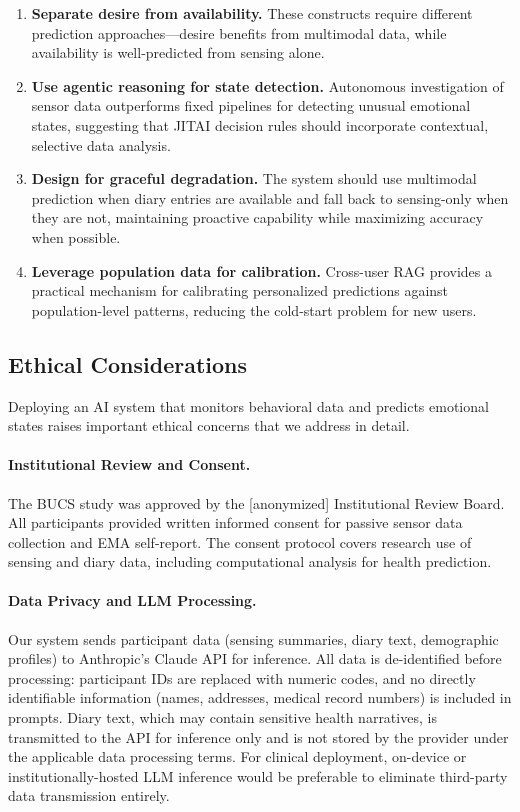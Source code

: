 \documentclass[screen,review,anonymous]{acmart}
\begin{document}
\begin{enumerate}[nosep]
    \item \textbf{Separate desire from availability.} These constructs require different prediction approaches---desire benefits from multimodal data, while availability is well-predicted from sensing alone.

    \item \textbf{Use agentic reasoning for state detection.} Autonomous investigation of sensor data outperforms fixed pipelines for detecting unusual emotional states, suggesting that JITAI decision rules should incorporate contextual, selective data analysis.

    \item \textbf{Design for graceful degradation.} The system should use multimodal prediction when diary entries are available and fall back to sensing-only when they are not, maintaining proactive capability while maximizing accuracy when possible.

    \item \textbf{Leverage population data for calibration.} Cross-user RAG provides a practical mechanism for calibrating personalized predictions against population-level patterns, reducing the cold-start problem for new users.
\end{enumerate}

\subsection{Ethical Considerations}

Deploying an AI system that monitors behavioral data and predicts emotional states raises important ethical concerns that we address in detail.

\paragraph{Institutional Review and Consent.}
The BUCS study was approved by the [anonymized] Institutional Review Board. All participants provided written informed consent for passive sensor data collection and EMA self-report. The consent protocol covers research use of sensing and diary data, including computational analysis for health prediction.

\paragraph{Data Privacy and LLM Processing.}
Our system sends participant data (sensing summaries, diary text, demographic profiles) to Anthropic's Claude API for inference. All data is de-identified before processing: participant IDs are replaced with numeric codes, and no directly identifiable information (names, addresses, medical record numbers) is included in prompts. Diary text, which may contain sensitive health narratives, is transmitted to the API for inference only and is not stored by the provider under the applicable data processing terms. For clinical deployment, on-device or institutionally-hosted LLM inference would be preferable to eliminate third-party data transmission entirely.
\end{document}
